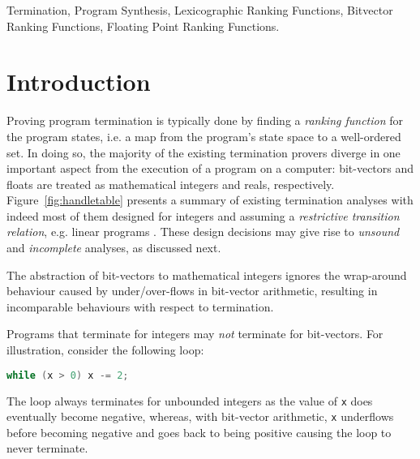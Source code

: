 \documentclass[preprint]{sigplanconf}
\theoremstyle{definition}
\begin{document}
\keywords
Termination, Program Synthesis, Lexicographic Ranking Functions, Bitvector Ranking Functions,
Floating Point Ranking Functions.

\section{Introduction}\label{sec:intro}

Proving program termination is typically done by finding a \emph{ranking function}
for the program states, i.e. a map from the program's state space to a well-ordered set.
In doing so, the majority of the existing termination provers diverge 
in one important aspect from the execution of a program on a computer:
bit-vectors and floats are treated as mathematical integers and reals, respectively.
Figure~\ref{fig:handletable} presents a summary of existing termination analyses with indeed
most of them designed for integers and assuming a \emph{restrictive transition relation}, e.g. linear programs \cite{DBLP:conf/pldi/CookPR06,DBLP:conf/popl/Ben-AmramG13,DBLP:conf/vmcai/P04,DBLP:conf/atva/HeizmannHLP13,DBLP:conf/vmcai/BradleyMS05,DBLP:conf/cav/KroeningSTW10}. 
These design decisions may give rise to 
{\em unsound} and {\em incomplete} analyses, as discussed next.


The abstraction of bit-vectors to mathematical integers ignores
the wrap-around behaviour caused by under/over-flows in bit-vector arithmetic, resulting in
incomparable behaviours with respect to termination.

Programs that terminate for integers may \emph{not} terminate for bit-vectors. For illustration, consider the following loop:
\begin{lstlisting}[language=C]
while (x > 0) x -= 2;
\end{lstlisting}
The loop always terminates for unbounded integers as the value of \texttt{x} does eventually become negative, 
whereas, with bit-vector arithmetic, \texttt{x} underflows before becoming negative and goes back to being positive causing the loop to never terminate.
\end{document}
